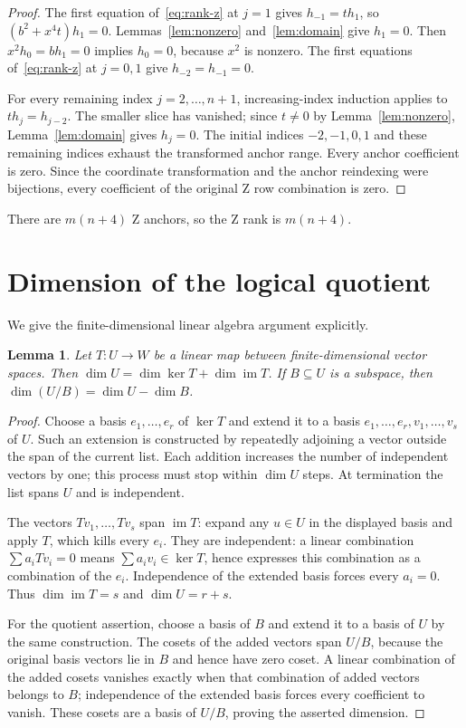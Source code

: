 \documentclass{article}
\newtheorem{lemma}{Lemma}
\begin{document}
\begin{proof}
The first equation of~\eqref{eq:rank-z} at \(j=1\) gives \(h_{-1}=t h_1\), so
\((b^2+x^4t)h_1=0\). Lemmas~\ref{lem:nonzero} and~\ref{lem:domain} give \(h_1=0\).
Then \(x^2h_0=b h_1=0\) implies \(h_0=0\), because \(x^2\) is nonzero. The first
equations of~\eqref{eq:rank-z} at \(j=0,1\) give \(h_{-2}=h_{-1}=0\).

For every remaining index \(j=2,\ldots,n+1\), increasing-index induction applies to
\(t h_j=h_{j-2}\). The smaller slice has vanished; since \(t\ne 0\) by
Lemma~\ref{lem:nonzero}, Lemma~\ref{lem:domain} gives \(h_j=0\). The initial indices
\(-2,-1,0,1\) and these remaining indices exhaust the transformed anchor range. Every
anchor coefficient is zero. Since the coordinate transformation and the anchor
reindexing were bijections, every coefficient of the original Z row combination is
zero.
\end{proof}

There are \(m(n+4)\) Z anchors, so the Z rank is \(m(n+4)\).

\section{Dimension of the logical quotient}\label{sec:quotient}

We give the finite-dimensional linear algebra argument explicitly.

\begin{lemma}\label{lem:rank-nullity}
Let \(T:U\to W\) be a linear map between finite-dimensional vector
spaces. Then \(\dim U=\dim\ker T+\dim\operatorname{im} T\). If \(B\subseteq U\) is a
subspace, then \(\dim(U/B)=\dim U-\dim B\).
\end{lemma}

\begin{proof}
Choose a basis \(e_1,\ldots,e_r\) of \(\ker T\) and extend it to a basis
\(e_1,\ldots,e_r,\allowbreak v_1,\ldots,v_s\) of \(U\). Such an extension is constructed by
repeatedly adjoining a vector outside the span of the current list. Each addition
increases the number of independent vectors by one; this process must stop
within \(\dim U\) steps. At termination the list spans \(U\) and is independent.

The vectors \(Tv_1,\ldots,Tv_s\) span \(\operatorname{im} T\): expand any \(u\in U\)
in the displayed basis and apply \(T\), which kills every \(e_i\). They are
independent: a linear combination \(\sum a_iTv_i=0\) means
\(\sum a_iv_i\in\ker T\), hence expresses this combination as a combination of the
\(e_i\). Independence of the extended basis forces every \(a_i=0\). Thus
\(\dim\operatorname{im} T=s\) and \(\dim U=r+s\).

For the quotient assertion, choose a basis of \(B\) and extend it to a basis of
\(U\) by the same construction. The cosets of the added vectors span \(U/B\),
because the original basis vectors lie in \(B\) and hence have zero coset.
A linear combination of the added cosets vanishes exactly when that
combination of added vectors belongs to \(B\); independence of the extended
basis forces every coefficient to vanish. These cosets are a basis of
\(U/B\), proving the asserted dimension.
\end{proof}
\end{document}

